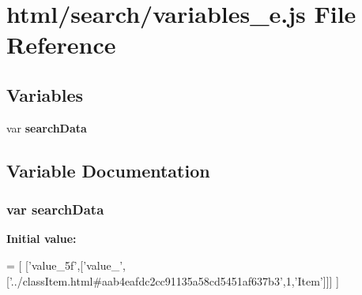 \section{html/search/variables\-\_\-e.js File Reference}
\label{variables__e_8js}
\subsection*{Variables}
\begin{DoxyCompactItemize}
\item 
var {\bf search\-Data}
\end{DoxyCompactItemize}


\subsection{Variable Documentation}
\subsubsection[{search\-Data}]{\setlength{\rightskip}{0pt plus 5cm}var search\-Data}\label{variables__e_8js_ad01a7523f103d6242ef9b0451861231e}
{\bfseries Initial value\-:}
\begin{DoxyCode}
=
[
  [\textcolor{stringliteral}{'value\_5f'},[\textcolor{stringliteral}{'value\_'},[\textcolor{stringliteral}{'../classItem.html#aab4eafdc2cc91135a58cd5451af637b3'},1,\textcolor{stringliteral}{'Item'}]]]
]
\end{DoxyCode}
